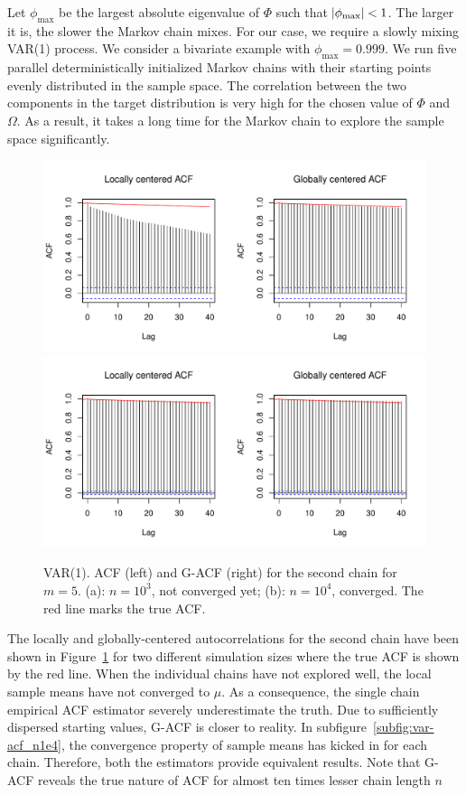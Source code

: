 \documentclass[11pt]{article}
\theoremstyle{remark}
\begin{document}
Let $\phi_{\max}$ be the largest absolute eigenvalue of $\Phi$ such that $\abs{\phi_{\max}} < 1$. The larger it is, the slower the Markov chain mixes. For our case, we require a slowly mixing VAR(1) process. We consider a bivariate example with $\phi_{\max} = 0.999$. We run five parallel deterministically initialized Markov chains with their starting points evenly distributed in the sample space. The correlation between the two components in the target distribution is very high for the chosen value of $\Phi$ and $\Omega$. As a result, it takes a long time for the Markov chain to explore the sample space significantly. 

\begin{figure}[h]
\centering
   \includegraphics[width=.5\linewidth]{plots/var-acf_n1000.pdf}
     \includegraphics[width=.5\linewidth]{plots/var-acf_n10000.pdf} 
\caption{VAR(1). ACF (left) and G-ACF (right) for the second chain for $m=5$. (a): $n = 10^3$, not converged yet; (b): $n =  10^4$, converged. The red line marks the true ACF.}
\label{fig:var-acf}
\end{figure}

The locally and globally-centered autocorrelations for the second chain have been shown in Figure~\ref{fig:var-acf} for two different simulation sizes where the true ACF is shown by the red line. When the individual chains have not explored well, the local sample means have not converged to $\mu$. As a consequence, the single chain empirical ACF estimator severely underestimate the truth. Due to sufficiently dispersed starting values, G-ACF is closer to reality. In subfigure~\ref{subfig:var-acf_n1e4}, the convergence property of sample means has kicked in for each chain. Therefore, both the estimators provide equivalent results. Note that G-ACF reveals the true nature of ACF for almost ten times lesser chain length $n$
\end{document}
